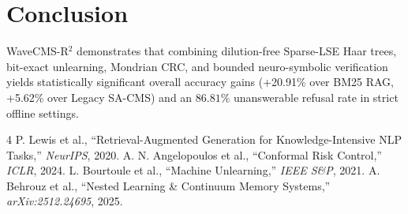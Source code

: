 \documentclass[conference]{IEEEtran}
\begin{document}
\section{Conclusion}
WaveCMS-R$^2$ demonstrates that combining dilution-free Sparse-LSE Haar trees, bit-exact unlearning, Mondrian CRC, and bounded neuro-symbolic verification yields statistically significant overall accuracy gains (+20.91\% over BM25 RAG, +5.62\% over Legacy SA-CMS) and an $86.81\%$ unanswerable refusal rate in strict offline settings.

\begin{thebibliography}{4}
 P. Lewis et al., ``Retrieval-Augmented Generation for Knowledge-Intensive NLP Tasks,'' \emph{NeurIPS}, 2020.
 A. N. Angelopoulos et al., ``Conformal Risk Control,'' \emph{ICLR}, 2024.
 L. Bourtoule et al., ``Machine Unlearning,'' \emph{IEEE S\&P}, 2021.
 A. Behrouz et al., ``Nested Learning & Continuum Memory Systems,'' \emph{arXiv:2512.24695}, 2025.
\end{thebibliography}
\end{document}
